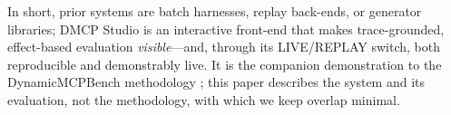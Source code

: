In short, prior systems are batch harnesses, replay back-ends, or generator
libraries; DMCP Studio is an interactive front-end that makes
trace-grounded, effect-based evaluation \emph{visible}---and, through its
LIVE/REPLAY switch, both reproducible and demonstrably live. It is the
companion demonstration to the DynamicMCPBench methodology
\citep{dynamicmcpbench2026}; this paper describes the system and its
evaluation, not the methodology, with which we keep overlap minimal.
